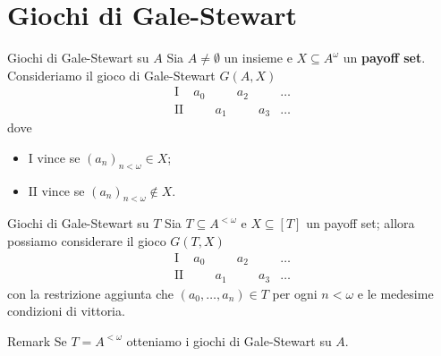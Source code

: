 \documentclass[aspectratio=43]{beamer}
\begin{document}
\section{Giochi di Gale-Stewart}

\begin{frame}{Giochi di Gale-Stewart su \(A\)}
  Sia \(A \neq \emptyset\) un insieme e \(X \subseteq A^\omega\) un \textbf{payoff set}.
  Consideriamo il gioco di Gale-Stewart \(G(A, X)\)
  \begin{equation*}
    \begin{matrix}
      \mathrm{I} & a_0 & & a_2 & & \ldots\\
      \mathrm{II} & & a_1 & & a_3 & \ldots
    \end{matrix}
  \end{equation*}
  \pause
  dove
  \begin{itemize}
  \item \(\mathrm{I}\) vince se \((a_n)_{n < \omega} \in X\);
  \item \(\mathrm{II}\) vince se \((a_n)_{n < \omega} \not\in X\).
  \end{itemize}
\end{frame}

\begin{frame}{Giochi di Gale-Stewart su \(T\)}
  Sia \(T \subseteq A^{<\omega}\) e \(X\subseteq [T]\) un payoff set; allora possiamo considerare il gioco \(G(T, X)\)
  \begin{equation*}
    \begin{matrix}
      \mathrm{I} & a_0 & & a_2 & & \ldots\\
      \mathrm{II} & & a_1 & & a_3 & \ldots
    \end{matrix}
  \end{equation*}
  con la restrizione aggiunta che \((a_0, \ldots, a_n) \in T\) per ogni \(n < \omega\) e le medesime condizioni di vittoria.
  \pause
  \begin{block}{Remark}
    Se \(T = A^{<\omega}\) otteniamo i giochi di Gale-Stewart su \(A\).
  \end{block}
\end{frame}
\end{document}
